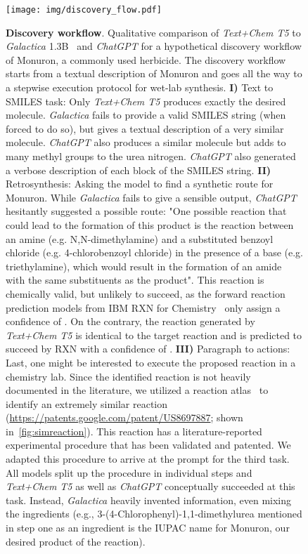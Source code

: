\documentclass[nohyperref]{article}
\theoremstyle{plain}
\theoremstyle{definition}
\theoremstyle{remark}
\begin{document}
\begin{figure}[ht]
    \centering
\texttt{[image: img/discovery\_flow.pdf]}
\caption{\textbf{Discovery workflow}. 
Qualitative comparison of \emph{Text+Chem T5} to \textit{Galactica} 1.3B~\cite{taylor2022galactica} and \textit{ChatGPT} for a hypothetical discovery workflow of Monuron, a commonly used herbicide. The discovery workflow starts from a textual description of Monuron and goes all the way to a stepwise execution protocol for wet-lab synthesis. \newline
\textbf{I) }Text to SMILES task: Only \textit{Text+Chem T5} produces exactly the desired molecule. \textit{Galactica} fails to provide a valid SMILES string (when forced to do so), but gives a textual description of a very similar molecule. \textit{ChatGPT} also produces a similar molecule but adds to many methyl groups to the urea nitrogen. \textit{ChatGPT} also generated a verbose description of each block of the SMILES string. \newline
\textbf{II) }Retrosynthesis: Asking the model to find a synthetic route for Monuron. While \textit{Galactica} fails to give a sensible output, \textit{ChatGPT} hesitantly suggested a possible route: "One possible reaction that could lead to the formation of this product is the reaction between an amine (e.g. N,N-dimethylamine) and a substituted benzoyl chloride (e.g. 4-chlorobenzoyl chloride) in the presence of a base (e.g. triethylamine), which would result in the formation of an amide with the same substituents as the product". 
This reaction is chemically valid, but unlikely to succeed, as the forward reaction prediction models from IBM RXN for Chemistry~\cite{schwaller2019molecular} only assign a confidence of . On the contrary, the reaction generated by \textit{Text+Chem T5} is identical to the target reaction and is predicted to succeed by RXN with a confidence of .
\newline
\textbf{III)} Paragraph to actions: Last, one might be interested to execute the proposed reaction in a chemistry lab. Since the identified reaction is not heavily documented in the literature, we utilized a reaction atlas~\cite{schwaller2021mapping} to identify an extremely similar reaction (\url{https://patents.google.com/patent/US8697887}; shown in~\autoref{fig:simreaction}). This reaction has a literature-reported experimental procedure that has been validated and patented. We adapted this procedure to arrive at the prompt for the third task.
All models split up the procedure in individual steps and \textit{Text+Chem T5} as well as \textit{ChatGPT} conceptually succeeded at this task. Instead, \textit{Galactica} heavily invented information, even mixing the ingredients (e.g., 3-(4-Chlorophenyl)-1,1-dimethylurea mentioned in step one as an ingredient is the IUPAC name for Monuron, our desired product of the reaction).  
}
\end{figure}
\end{document}
